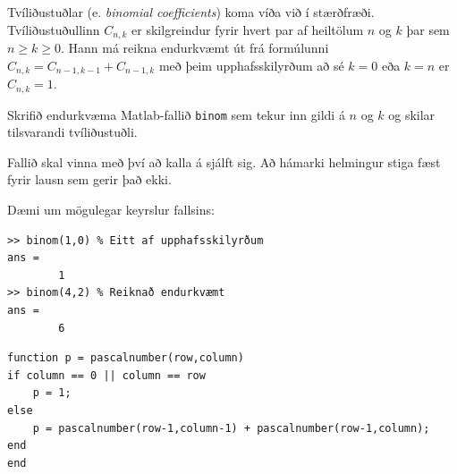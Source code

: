 \documentclass[addpoints]{exam}
\begin{document}
\begin{questions}
\newpage

\question[10] Tvíliðustuðlar (e. \emph{binomial coefficients}) koma víða við í stærðfræði. Tvíliðustuðullinn $C_{n,k}$ er skilgreindur fyrir hvert par af heiltölum $n$ og $k$ þar sem $n \geq k \geq 0$. Hann má reikna endurkvæmt út frá formúlunni $C_{n,k} = C_{n-1,k-1} + C_{n-1,k}$ með þeim upphafsskilyrðum að sé $k=0$ eða $k=n$ er $C_{n,k} = 1$.

Skrifið endurkvæma Matlab-fallið \texttt{binom} sem tekur inn gildi á $n$ og $k$ og skilar tilsvarandi tvíliðustuðli.

Fallið skal vinna með því að kalla á sjálft sig. Að hámarki helmingur stiga fæst fyrir lausn sem gerir það ekki.

Dæmi um mögulegar keyrslur fallsins:

\begin{verbatim}
>> binom(1,0) % Eitt af upphafsskilyrðum
ans =
        1
>> binom(4,2) % Reiknað endurkvæmt
ans =
        6
\end{verbatim}

\begin{solution}
 
\begin{verbatim}
function p = pascalnumber(row,column)
if column == 0 || column == row
    p = 1;
else
    p = pascalnumber(row-1,column-1) + pascalnumber(row-1,column);    
end
end
\end{verbatim}

\end{solution}

\newpage

\question

\end{questions}
\end{document}
